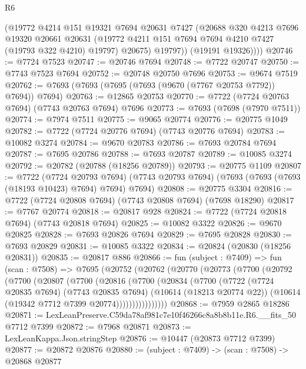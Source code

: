 \begin{lexlean}{R6}
\begin{coremodule}
            (@19772
              @4214
              @151
              @19321
              @7694
              @20631
              @7427
              (@20688
                @320
                @4213
                @7696
                @19320
                @20661
                @20631
                (@19772 @4211 @151 @7694 @7694 @4210 @7427 (@19793 @322 @4210) @19797)
                @20675)
              @19797))
          (@19191 @19326))))
@20746 := @7724 @7523
@20747 := @20746 @7694
@20748 := @7722 @20747
@20750 := @7743 @7523 @7694
@20752 := @20748 @20750 @7696
@20753 := @9674 @7519
@20762 := @7693 (@7693 (@7695 (@7693 (@9670 (@7767 @20753 @7792)) @7694)) @7694)
@20763 := @12865 @20753
@20770 := @7722 (@7724 @20763 @7694) (@7743 @20763 @7694) @7696
@20773 := @7693 (@7698 (@7970 @7511))
@20774 := @7974 @7511
@20775 := @9065 @20774
@20776 := @20775 @1049
@20782 := @7722 (@7724 @20776 @7694) (@7743 @20776 @7694)
@20783 := @10082 @3274
@20784 := @9670 @20783
@20786 := @7693 @20784 @7694
@20787 := @7695 @20786
@20788 := @7693 @20787
@20789 := @10085 @3274
@20792 := @20782 (@20788 (@18256 @20789))
@20793 := @20775 @1109
@20807 := @7722
    (@7724 @20793 @7694)
    (@7743 @20793 @7694)
    (@7693 (@7693 (@7693 (@18193 @10423) @7694) @7694) @7694)
@20808 := @20775 @3304
@20816 := @7722 (@7724 @20808 @7694) (@7743 @20808 @7694) (@7698 @18290)
@20817 := @7767 @20774
@20818 := @20817 @928
@20824 := @7722 (@7724 @20818 @7694) (@7743 @20818 @7694)
@20825 := @10082 @3322
@20826 := @9670 @20825
@20828 := @7693 @20826 @7694
@20829 := @7695 @20828
@20830 := @7693 @20829
@20831 := @10085 @3322
@20834 := @20824 (@20830 (@18256 @20831))
@20835 := @20817 @886
@20866 := fun (subject : @7409) =>
  fun (scan : @7508) =>
  @7695
    (@20752
      (@20762
        (@20770
          (@20773
            (@7700
              (@20792
                (@7700
                  (@20807
                    (@7700
                      (@20816
                        (@7700
                          (@20834
                            (@7700
                              (@7722
                                (@7724 @20835 @7694)
                                (@7743 @20835 @7694)
                                (@10614 (@18213 @20774 @22))
                                (@10614 (@19342 @7712 @7399 @20774))))))))))))))))
@20868 := @7959 @2865 @18286
@20871 := LexLeanPreserve.C59da78af981c7e10f46266c8a8b8b11e.R6.__fits_50 @7712 @7399
@20872 := @7968 @20871
@20873 := LexLeanKappa.Json.stringStep
@20876 := @10447 (@20873 @7712 @7399)
@20877 := @20872 @20876
@20880 := (subject : @7409) -> (scan : @7508) -> @20868 @20877

\end{coremodule}
\end{lexlean}
